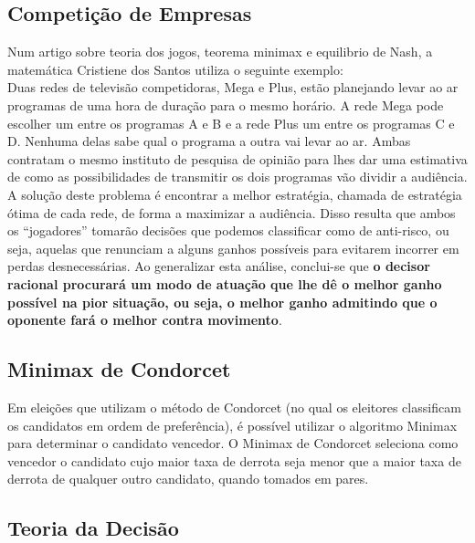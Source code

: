 \documentclass[]{article}
\begin{document}
    \subsection{Competição de Empresas}
    Num artigo sobre teoria dos jogos, teorema minimax e equilibrio de Nash, a matemática Cristiene dos Santos utiliza o seguinte exemplo: \cite{artg} \\
    
    Duas redes de televisão competidoras, Mega e Plus, estão planejando levar ao ar programas
    de uma hora de duração para o mesmo horário. A rede Mega pode escolher um entre os
    programas A e B e a rede Plus um entre os programas C e D. Nenhuma delas sabe qual o
    programa a outra vai levar ao ar. Ambas contratam o mesmo instituto de pesquisa de opinião para lhes dar uma estimativa de como as possibilidades de transmitir os dois programas vão  dividir a audiência. \\
    
    A solução deste problema é encontrar a melhor estratégia, chamada de estratégia ótima de
    cada rede, de forma a maximizar a audiência. Disso resulta que ambos os “jogadores”
    tomarão decisões que podemos classificar como de anti-risco, ou seja, aquelas que renunciam
    a alguns ganhos possíveis para evitarem incorrer em perdas desnecessárias. Ao generalizar
    esta análise, conclui-se que \textbf{o decisor racional procurará um modo de atuação que lhe dê o
    melhor ganho possível na pior situação, ou seja, o melhor ganho admitindo que o oponente
    fará o melhor contra movimento}. \\

\subsection{Minimax de Condorcet}

Em eleições que utilizam o método de Condorcet (no qual os eleitores classificam os candidatos em ordem de preferência), é possível utilizar o algoritmo Minimax para determinar o candidato vencedor. O Minimax de Condorcet seleciona como vencedor o candidato cujo maior taxa de derrota seja menor que a maior taxa de derrota de qualquer outro candidato, quando tomados em pares. \cite{condorcet} \\
   
\subsection{Teoria da Decisão}
\end{document}
